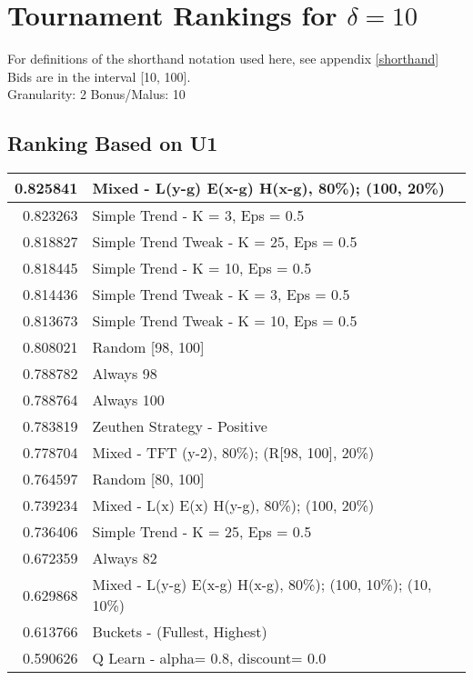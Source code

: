 \newpage  
\section{Tournament Rankings for $\delta = 10$}\label{results_10}
For definitions of the shorthand notation used here, see appendix \ref{shorthand} \\
\newline
Bids are in the interval [10, 100].\\
Granularity: 2\hspace{0.25in} Bonus/Malus: 10\\
\begin{table}[!hbtp]
\subsection{Ranking Based on U1}
\begin{footnotesize}
\begin{tabular}{|r|l|}\hline  \label{U3results}
0.825841 & Mixed - {L(y-g) E(x-g) H(x-g), 80\%); (100, 20\%)}\\ \hline
0.823263 & Simple Trend - K = 3, Eps = 0.5\\ \hline
0.818827 & Simple Trend Tweak - K = 25, Eps = 0.5\\ \hline
0.818445 & Simple Trend - K = 10, Eps = 0.5\\ \hline
0.814436 & Simple Trend Tweak - K = 3, Eps = 0.5\\ \hline
0.813673 & Simple Trend Tweak - K = 10, Eps = 0.5\\ \hline
0.808021 & Random [98, 100]\\ \hline
0.788782 & Always 98\\ \hline
0.788764 & Always 100\\ \hline
0.783819 & Zeuthen Strategy - Positive\\ \hline
0.778704 & Mixed - {TFT (y-2), 80\%); (R[98, 100], 20\%)}\\ \hline
0.764597 & Random [80, 100]\\ \hline
0.739234 & Mixed - {L(x) E(x) H(y-g), 80\%); (100, 20\%)}\\ \hline
0.736406 & Simple Trend - K = 25, Eps = 0.5\\ \hline
0.672359 & Always 82\\ \hline
0.629868 & Mixed - {L(y-g) E(x-g) H(x-g), 80\%); (100, 10\%); (10, 10\%)}\\ \hline
0.613766 & Buckets - (Fullest, Highest)\\ \hline
0.590626 & Q Learn - alpha= 0.8, discount= 0.0\\ \hline

\end{tabular}
\end{footnotesize}
\end{table}
